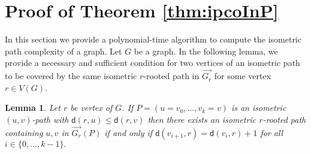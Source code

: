 \documentclass[a4paper]{article}
\newcommand{\dist}[2]{\mathsf{d}\left(#1,#2\right)}
\newcommand{\ipac}[1]{ipacc\left(#1\right)}
\newtheorem{proposition}[theorem]{Proposition}
\newtheorem{lemma}[theorem]{Lemma}
\newtheorem{definition}[theorem]{Definition}
\begin{document}








\section{Proof of Theorem \ref{thm:ipcoInP}} \label{sec:ipcoInP}


In this section we provide a polynomial-time algorithm to compute the
isometric path complexity of a graph. Let $G$ be a graph.  In the
following lemma, we provide a necessary and sufficient condition for
two vertices of an isometric path to be covered by the same isometric
$r$-rooted path in $\overrightarrow{G_r}$ for some vertex $r\in V(G)$.

\begin{lemma}\label{lemma1}
  Let $r$ be vertex of $G$. If $P=(u=v_0,\dots,v_k=v)$ is an isometric
  $(u,v)$-path with $\dist{r}{u}\le \dist{r}{v}$ then there exists an
  isometric $r$-rooted path containing $u, v$ in
  $\overrightarrow{G_r}(P)$ if and only if
  $\dist{v_{i+1}}{r} = \dist{v_i}{r}+1$ for all
  $i\in \{0,\dots,k-1\}.$
\end{lemma}

\end{document}
